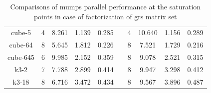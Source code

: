 \begin{table}[htpb]
\begin{tabular}{c|c|c|c|c|c|c|c|c|c|}
\multicolumn{1}{|c|}{cube-5}                                                & 4   & 8.261                                                              & 1.139                                              & 0.285                                                  & \multicolumn{1}{c|}{} & 4   & 10.640                                                             & 1.156                                              & 0.289                                                  \\ \cline{1-5} \cline{7-10} 
\multicolumn{1}{|c|}{cube-64}                                               & 8   & 5.645                                                              & 1.812                                              & 0.226                                                  & \multicolumn{1}{c|}{} & 8   & 7.521                                                              & 1.729                                              & 0.216                                                  \\ \cline{1-5} \cline{7-10} 
\multicolumn{1}{|c|}{cube-645}                                              & 6   & 9.985                                                              & 2.152                                              & 0.359                                                  & \multicolumn{1}{c|}{} & 8   & 9.078                                                              & 2.521                                              & 0.315                                                  \\ \cline{1-5} \cline{7-10} 
\multicolumn{1}{|c|}{k3-2}                                                  & 7   & 7.788                                                              & 2.899                                              & 0.414                                                  & \multicolumn{1}{c|}{} & 8   & 9.947                                                              & 3.298                                              & 0.412                                                  \\ \cline{1-5} \cline{7-10} 
\multicolumn{1}{|c|}{k3-18}                                                 & 8   & 6.716                                                              & 3.472                                              & 0.434                                                  & \multicolumn{1}{c|}{} & 8   & 9.567                                                              & 3.896                                              & 0.487                                                  \\ \cline{1-5} \cline{7-10} 
\end{tabular}
\caption{Comparisons of \gls{mumps} parallel performance at the saturation points in case of factorization of \gls{grs} matrix set}
\label{table:pinning-comparison-grs-matrix-set}
\end{table}



